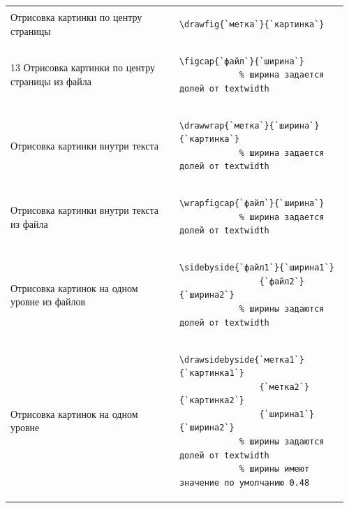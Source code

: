 \noindent
\begin{longtable}{S{0.48\linewidth} S{0.485\linewidth}}
    Отрисовка картинки по центру страницы &
        \begin{lstlisting}[gobble = 11]
            \drawfig{`метка`}{`картинка`}
        \end{lstlisting} \\    13
    Отрисовка картинки по центру страницы из файла &
        \begin{lstlisting}[gobble = 11]
            \figcap{`файл`}{`ширина`}
            % ширина задается долей от textwidth
        \end{lstlisting} \\
    Отрисовка картинки внутри текста &
        \begin{lstlisting}[gobble = 11]
            \drawwrap{`метка`}{`ширина`}{`картинка`}
            % ширина задается долей от textwidth
        \end{lstlisting} \\
    Отрисовка картинки внутри текста из файла &
        \begin{lstlisting}[gobble = 11]
            \wrapfigcap{`файл`}{`ширина`}
            % ширина задается долей от textwidth
        \end{lstlisting} \\
    Отрисовка картинок на одном уровне из файлов &
        \begin{lstlisting}[gobble = 11]
            \sidebyside{`файл1`}{`ширина1`}
                {`файл2`}{`ширина2`}
            % ширины задаются долей от textwidth
        \end{lstlisting} \\
    Отрисовка картинок на одном уровне &
        \begin{lstlisting}[gobble = 11]
            \drawsidebyside{`метка1`}{`картинка1`}
                {`метка2`}{`картинка2`}
                {`ширина1`}{`ширина2`}
            % ширины задаются долей от textwidth
            % ширины имеют значение по умолчанию 0.48
        \end{lstlisting} \\
\end{longtable}
